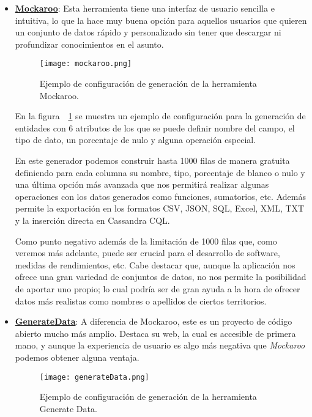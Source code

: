 \begin{itemize}

	\item \textbf{\href{https://mockaroo.com}{Mockaroo}}: Esta herramienta tiene una interfaz de usuario sencilla e intuitiva, lo que la hace muy buena opción para aquellos usuarios que quieren un conjunto de datos rápido y personalizado sin tener que descargar ni profundizar conocimientos en el asunto.


	\begin{figure}[h!]
		\centerline{\texttt{[image: mockaroo.png]}}
		\caption{Ejemplo de configuración de generación de la herramienta Mockaroo.}
		\label{figure:mockarooWeb}
	\end{figure}

	En la figura~~\ref{figure:mockarooWeb} se muestra un ejemplo de configuración para la generación de entidades con 6 atributos de los que se puede definir nombre del campo, el tipo de dato, un porcentaje de nulo y alguna operación especial.

	En este generador podemos construir hasta 1000 filas de manera gratuita definiendo para cada columna su nombre, tipo, porcentaje de blanco o nulo y una última opción más avanzada que nos permitirá realizar algunas operaciones con los datos generados como funciones, sumatorios, etc. Además permite la exportación en los formatos CSV, JSON, SQL, Excel, XML, TXT y la inserción directa en Cassandra CQL.

	Como punto negativo además de la limitación de 1000 filas que, como veremos más adelante, puede ser crucial para el desarrollo de software, medidas de rendimientos, etc. Cabe destacar que, aunque la aplicación nos ofrece una gran variedad de conjuntos de datos, no nos permite la posibilidad de aportar uno propio; lo cual podría ser de gran ayuda a la hora de ofrecer datos más realistas como nombres o apellidos de ciertos territorios.


	\item \textbf{\href{https://generatedata.com}{GenerateData}}: A diferencia de Mockaroo, este es un proyecto de código abierto mucho más amplio. Destaca su web, la cual es accesible de primera mano, y aunque la experiencia de usuario es algo más negativa que \textit{Mockaroo} podemos obtener alguna ventaja.

	\begin{figure}[h!]
		\centerline{\texttt{[image: generateData.png]}}
		\caption{Ejemplo de configuración de generación de la herramienta Generate Data.}
		\label{figure:generateDataWeb}
	\end{figure}	


\end{itemize}
